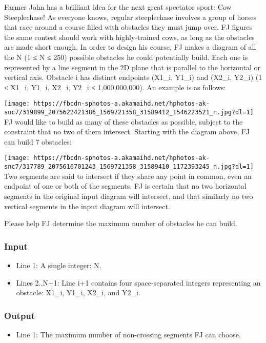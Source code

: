 



    Farmer John has a brilliant idea for the next great spectator sport: Cow Steeplechase! As everyone knows, regular steeplechase involves a group of horses that race around a course filled with obstacles they must jump over. FJ figures the same contest should work with highly-trained cows, as long as the obstacles are made short enough.  In order to design his course, FJ makes a diagram of all the N (1 ≤ N ≤ 250) possible obstacles he could potentially build. Each one is represented by a line segment in the 2D plane that is parallel to the horizontal or vertical axis. Obstacle i has distinct endpoints (X1\_i, Y1\_i) and (X2\_i, Y2\_i) (1 ≤ X1\_i, Y1\_i, X2\_i, Y2\_i ≤ 1,000,000,000). An example is as follows:   


\texttt{[image: https://fbcdn-sphotos-a.akamaihd.net/hphotos-ak-snc7/319899\_2075622421386\_1569721358\_31589412\_1546223521\_n.jpg?dl=1]}
\\

    FJ would like to build as many of these obstacles as possible, subject to the constraint that no two of them intersect. Starting with the diagram above, FJ can build 7 obstacles:   


\texttt{[image: https://fbcdn-sphotos-a.akamaihd.net/hphotos-ak-snc7/317789\_2075616701243\_1569721358\_31589410\_1172393245\_n.jpg?dl=1]}
\\

    Two segments are said to intersect if they share any point in common, even an endpoint of one or both of the segments.  FJ is certain that no two horizontal segments in the original input diagram will intersect, and that similarly no two vertical segments in the input diagram will intersect.   

    Please help FJ determine the maximum number of obstacles he can build.   

\subsubsection{   Input  }
\begin{itemize}
	\item      Line 1: A single integer: N.    
	\item      Lines 2..N+1: Line i+1 contains four space-separated integers         representing an obstacle: X1\_i, Y1\_i, X2\_i, and Y2\_i.    
\end{itemize}

\subsubsection{   Output  }
\begin{itemize}
	\item      Line 1: The maximum number of non-crossing segments FJ can choose.    
\end{itemize}

